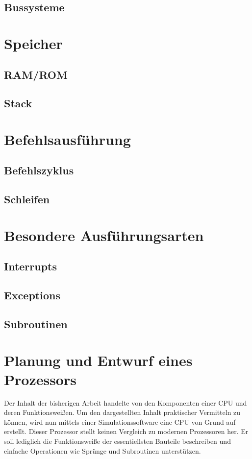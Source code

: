 \documentclass[12pt]{article}
\begin{document}
\subsection{Bussysteme}

\section{Speicher}
\subsection{RAM/ROM}
\subsection{Stack}

\section{Befehlsausführung}
\subsection{Befehlszyklus}
\subsection{Schleifen}

\section{Besondere Ausführungsarten}
\subsection{Interrupts}
\subsection{Exceptions}
\subsection{Subroutinen}

\newpage

\section{Planung und Entwurf eines Prozessors}
Der Inhalt der bisherigen Arbeit handelte von den Komponenten einer CPU und deren Funktionsweißen. Um den dargestellten Inhalt praktischer Vermitteln zu können, wird nun mittels einer Simulationssoftware eine CPU von Grund auf erstellt. Dieser Prozessor stellt keinen Vergleich zu modernen Prozessoren her. Er soll lediglich die Funktionsweiße der essentiellsten Bauteile beschreiben und einfache Operationen wie Sprünge und Subroutinen unterstützen.
\end{document}

